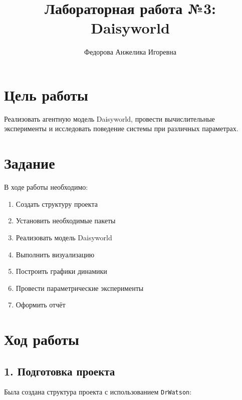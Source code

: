 \documentclass[
  english,
  russian,
  12pt,
  a4paper,
  DIV=11,
  numbers=noendperiod]{scrreprt}
\title{Лабораторная работа №3: Daisyworld}
\author{Федорова Анжелика Игоревна}
\date{}
\providecommand{\tightlist}{%
  \setlength{\itemsep}{0pt}\setlength{\parskip}{0pt}}
\renewcommand*\contentsname{Содержание}
\newcommand\contentsname{Содержание}
\begin{document}
\maketitle

\renewcommand*\contentsname{Содержание}
{
\setcounter{tocdepth}{1}
\tableofcontents
}
\listoffigures
\listoftables

\chapter{Цель
работы}\label{ux446ux435ux43bux44c-ux440ux430ux431ux43eux442ux44b}

Реализовать агентную модель Daisyworld, провести вычислительные
эксперименты и исследовать поведение системы при различных параметрах.

\chapter{Задание}\label{ux437ux430ux434ux430ux43dux438ux435}

В ходе работы необходимо:

\begin{enumerate}
\def\labelenumi{\arabic{enumi}.}
\tightlist
\item
  Создать структуру проекта
\item
  Установить необходимые пакеты
\item
  Реализовать модель Daisyworld
\item
  Выполнить визуализацию
\item
  Построить графики динамики
\item
  Провести параметрические эксперименты
\item
  Оформить отчёт
\end{enumerate}

\chapter{Ход
работы}\label{ux445ux43eux434-ux440ux430ux431ux43eux442ux44b}

\section{1. Подготовка
проекта}\label{ux43fux43eux434ux433ux43eux442ux43eux432ux43aux430-ux43fux440ux43eux435ux43aux442ux430}

Была создана структура проекта с использованием \texttt{DrWatson}:
\end{document}
